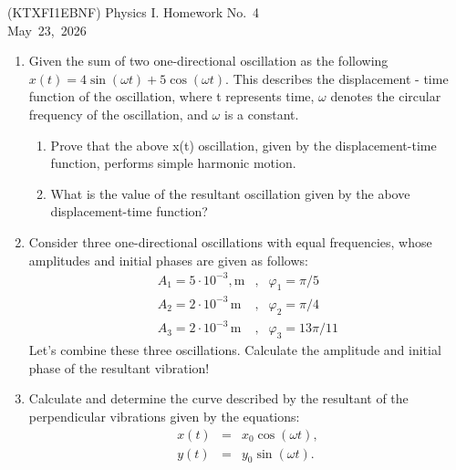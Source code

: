 \documentclass[a4paper,12pt]{letter}
\begin{document}
\begin{center}
 (KTXFI1EBNF) Physics I.  Homework No.~4\\ \smallskip
May~23,~2026
 \end{center}

\begin{enumerate}

\item  Given the sum of two one-directional oscillation as the following $x(t) = 4\sin(\omega t) + 5\cos(\omega t).$ This describes the displacement - time function of the oscillation, where t represents time, $\omega$ denotes the circular frequency of the oscillation, and $\omega$ is a constant.
\begin{enumerate}
  \item[a)] Prove that the above x(t) oscillation, given by the displacement-time function, performs simple harmonic motion.
  \item[b)] What is the value of the resultant oscillation given by the above displacement-time function?
\end{enumerate}


\item Consider three one-directional oscillations with equal frequencies, whose amplitudes and initial phases are given as follows:
\begin{eqnarray*}
A_1 = 5 \cdot 10^{-3},\mathrm{m}&,& \varphi_1 = \pi/5 \\
A_2 = 2 \cdot 10^{-3}\,\mathrm{m}&,& \varphi_2 = \pi/4 \\
A_3 = 2 \cdot 10^{-3}\,\mathrm{m}&,& \varphi_3 = 13\pi/11
\end{eqnarray*}
Let’s combine these three oscillations. Calculate the amplitude and initial phase of the resultant vibration!


\item  Calculate and determine the curve described by the resultant of the perpendicular vibrations given by the equations:
\begin{eqnarray*}
x(t) &=& x_0 \cos(\omega t),\\  
y(t) &=& y_0 \sin(\omega t).  
\end{eqnarray*}



\end{enumerate}
\end{document}

